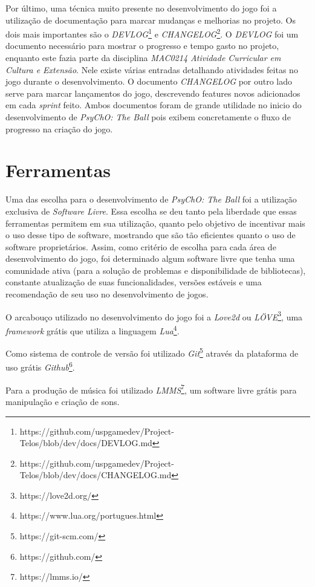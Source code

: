 Por último, uma técnica muito presente no desenvolvimento do jogo foi a utilização de documentação para marcar mudanças e melhorias no projeto. Os dois mais importantes são o \textit{DEVLOG}\footnote{https://github.com/uspgamedev/Project-Telos/blob/dev/docs/DEVLOG.md} e \textit{CHANGELOG}\footnote{https://github.com/uspgamedev/Project-Telos/blob/dev/docs/CHANGELOG.md}. O \textit{DEVLOG} foi um documento necessário para mostrar o progresso e tempo gasto no projeto, enquanto este fazia parte da disciplina \textit{MAC0214 Atividade Curricular em Cultura e Extensão}. Nele existe várias entradas detalhando atividades feitas no jogo durante o desenvolvimento. O documento \textit{CHANGELOG} por outro lado serve para marcar lançamentos do jogo, descrevendo features novos adicionados em cada \textit{sprint} feito. Ambos documentos foram de grande utilidade no inicio do desenvolvimento de \textit{PsyChO: The Ball} pois exibem concretamente o fluxo de progresso na criação do jogo.

\section{Ferramentas}
\label{sec:ferramentas}

Uma das escolha para o desenvolvimento de \textit{PsyChO: The Ball} foi a utilização exclusiva de \textit{Software Livre}. Essa escolha se deu tanto pela liberdade que essas ferramentas permitem em sua utilização, quanto pelo objetivo de incentivar mais o uso desse tipo de software, mostrando que são tão eficientes quanto o uso de software proprietários. Assim, como critério de escolha para cada área de desenvolvimento do jogo, foi determinado algum software livre que tenha uma comunidade ativa (para a solução de problemas e disponibilidade de bibliotecas), constante atualização de suas funcionalidades, versões estáveis e uma recomendação de seu uso no desenvolvimento de jogos.

O arcabouço utilizado no desenvolvimento do jogo foi a \textit{Love2d} ou \textit{LÖVE}\footnote{https://love2d.org/}, uma \textit{framework} grátis que utiliza a linguagem \textit{Lua}\footnote{https://www.lua.org/portugues.html}.

Como sistema de controle de versão foi utilizado \textit{Git}\footnote{https://git-scm.com/} através da plataforma de uso grátis \textit{Github}\footnote{https://github.com/}.

Para a produção de música foi utilizado \textit{LMMS}\footnote{https://lmms.io/}, um software livre grátis para manipulação e criação de sons.

